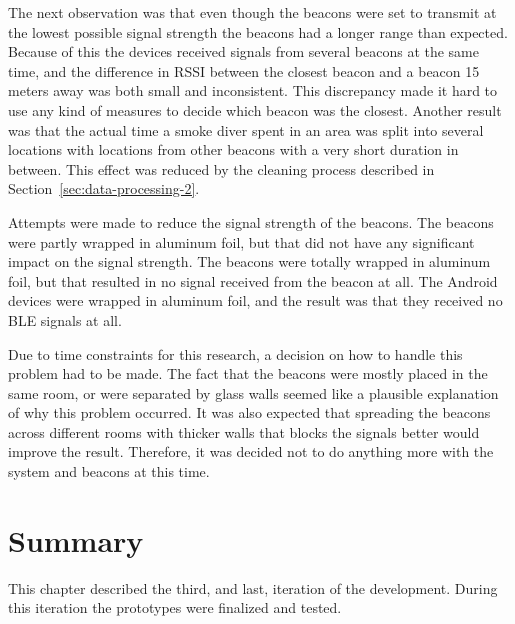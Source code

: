 \documentclass[../Main/thesis.tex]{subfiles}
\begin{document}
The next observation was that even though the beacons were set to transmit at the lowest possible signal strength the beacons had a longer range than expected.
Because of this the devices received signals from several beacons at the same time, and the difference in RSSI between the closest beacon and a beacon 15 meters away was both small and inconsistent.
This discrepancy made it hard to use any kind of measures to decide which beacon was the closest.
Another result was that the actual time a smoke diver spent in an area was split into several locations with locations from other beacons with a very short duration in between.
This effect was reduced by the cleaning process described in Section~\ref{sec:data-processing-2}.

Attempts were made to reduce the signal strength of the beacons.
The beacons were partly wrapped in aluminum foil, but that did not have any significant impact on the signal strength.
The beacons were totally wrapped in aluminum foil, but that resulted in no signal received from the beacon at all.
The Android devices were wrapped in aluminum foil, and the result was that they received no BLE signals at all.

Due to time constraints for this research, a decision on how to handle this problem had to be made.
The fact that the beacons were mostly placed in the same room, or were separated by glass walls seemed like a plausible explanation of why this problem occurred.
It was also expected that spreading the beacons across different rooms with thicker walls that blocks the signals better would improve the result.
Therefore, it was decided not to do anything more with the system and beacons at this time.

\section{Summary}
This chapter described the third, and last, iteration of the development.
During this iteration the prototypes were finalized and tested.

\blankpage
\end{document}
